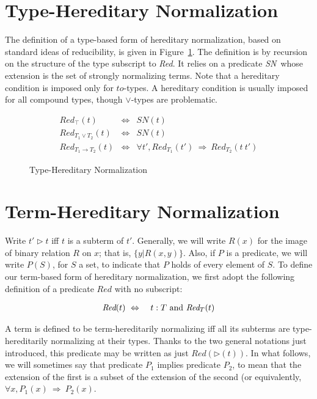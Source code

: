 \documentclass{article}
\newcommand{\red}[0]{\textit{Red}}
\newcommand{\sn}[0]{\textit{SN}}
\newcommand{\To}{\Rightarrow}
\begin{document}
\section{Type-Hereditary Normalization}

The definition of a type-based form of hereditary normalization, based
on standard ideas of reducibility, is given in
Figure~\ref{fig:type-hn}.  The definition is by recursion on the
structure of the type subscript to \red.  It relies on a predicate
\sn\ whose extension is the set of strongly normalizing terms.  Note
that a hereditary condition is imposed only for $to$-types.  A
hereditary condition is usually imposed for all compound types, though
$\vee$-types are problematic.

\begin{figure}
\begin{eqnarray*}
\red_{\top}(t) & \Leftrightarrow & \sn(t) \\
\red_{T_1\vee T_2}(t) & \Leftrightarrow & \sn(t) \\
\red_{T_1\to T_2}(t) & \Leftrightarrow & \forall t', \red_{T_1}(t')\ \To\ \red_{T_2}(t\ t')
\end{eqnarray*}
\caption{\label{fig:type-hn} Type-Hereditary Normalization}
\end{figure}

\section{Term-Hereditary Normalization}

Write $t' \rhd t$ iff $t$ is a subterm of $t'$.  Generally, we will
write $R(x)$ for the image of binary relation $R$ on $x$; that is, $\{
y | R(x,y) \}$.  Also, if $P$ is a predicate, we will write $P(S)$,
for $S$ a set, to indicate that $P$ holds of every element of $S$.  To
define our term-based form of hereditary normalization, we first adopt
the following definition of a predicate $\red$ with no subscript:

\begin{eqnarray*}
\red(t) &\ \Leftrightarrow\ & t : T\ \textnormal{and}\ \red_{T}(t)
\end{eqnarray*}

\noindent A term is defined to be term-hereditarily normalizing iff
all its subterms are type-hereditarily normalizing at their types.
Thanks to the two general notations just introduced, this predicate
may be written as just $\red(\rhd(t))$.  In what follows, we will
sometimes say that predicate $P_1$ implies predicate $P_2$, to mean
that the extension of the first is a subset of the extension of the
second (or equivalently, $\forall x, P_1(x)\ \To\ P_2(x)$.
\end{document}
